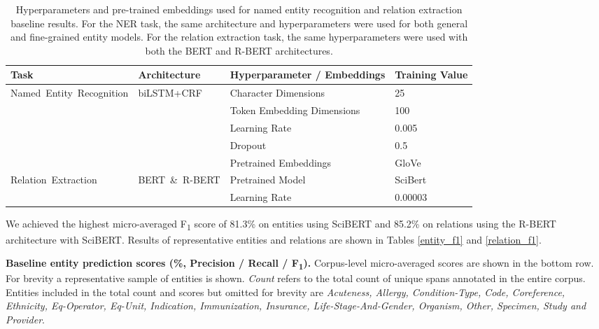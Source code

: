 \documentclass[../main.tex]{subfiles}
\begin{document}
\def\arraystretch{1.2}
\begin{table}[h!]
\begin{tabular}{m{4cm} m{3cm} m{5cm} m{3cm}}
 \toprule
 \textbf{Task} & \textbf{Architecture} & \textbf{Hyperparameter / Embeddings} & \textbf{Training Value} \\
 \hline
    \multirow{4}{}{\mbox{Named Entity Recognition}} &
    \multirow{4}{}{\mbox{biLSTM+CRF}} 
        & Character Dimensions & 25 \\
        & & Token Embedding Dimensions & 100 \\
        & & Learning Rate & 0.005 \\
        & & Dropout & 0.5 \\
        & & Pretrained Embeddings & GloVe \cite{pennington2014glove} \\
    \hline
    \multirow{2}{}{\mbox{Relation Extraction}} &
    \multirow{2}{}{\mbox{BERT \& R-BERT}} 
        & Pretrained Model & SciBert  \\
        & & Learning Rate & 0.00003 \\
 \hline
\end{tabular}
\caption{Hyperparameters and pre-trained embeddings used for named entity recognition and relation extraction baseline results. For the NER task, the same architecture and hyperparameters were used for both general and fine-grained entity models. For the relation extraction task, the same hyperparameters were used with both the BERT and R-BERT architectures.}
\label{tbl_hyperparams}
\end{table}

\noindent  We achieved the highest micro-averaged F\textsubscript{1} score of 81.3\% on entities using SciBERT and 85.2\% on relations using the R-BERT architecture with SciBERT. Results of representative entities and relations are shown in Tables \ref{entity_f1} and \ref{relation_f1}. \\

\begin{table}[tp]
    
    \caption{\textbf{Baseline entity prediction scores (\%, Precision / Recall / F\textsubscript{1}).} Corpus-level micro-averaged scores are shown in the bottom row. For brevity a representative sample of entities is shown. \textit{Count} refers to the total count of unique spans annotated in the entire corpus. Entities included in the total count and scores but omitted for brevity are \textit{Acuteness, Allergy, Condition-Type, Code, Coreference, Ethnicity, Eq-Operator, Eq-Unit, Indication, Immunization, Insurance, Life-Stage-And-Gender, Organism, Other, Specimen, Study and Provider}.}
    \label{entity_f1}
\end{table}
\end{document}
